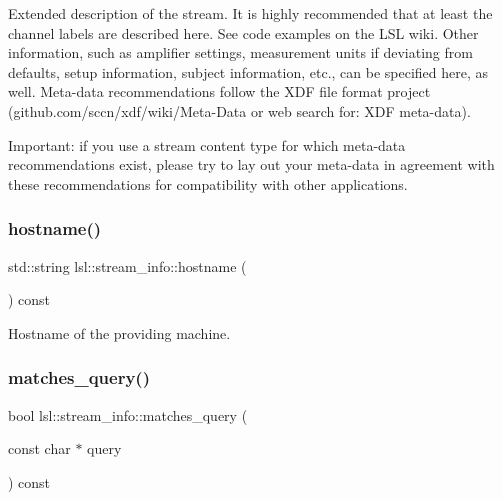 Extended description of the stream. It is highly recommended that at least the channel labels are described here. See code examples on the L\+SL wiki. Other information, such as amplifier settings, measurement units if deviating from defaults, setup information, subject information, etc., can be specified here, as well. Meta-\/data recommendations follow the X\+DF file format project (github.\+com/sccn/xdf/wiki/\+Meta-\/\+Data or web search for\+: X\+DF meta-\/data).

Important\+: if you use a stream content type for which meta-\/data recommendations exist, please try to lay out your meta-\/data in agreement with these recommendations for compatibility with other applications. \mbox{\label{classlsl_1_1stream__info_a52db8d9e073297477d1183dfebe8dcda}} 
\subsubsection{\texorpdfstring{hostname()}{hostname()}}
{\footnotesize\ttfamily std\+::string lsl\+::stream\+\_\+info\+::hostname (\begin{DoxyParamCaption}{ }\end{DoxyParamCaption}) const\hspace{0.3cm}{\ttfamily [inline]}}

Hostname of the providing machine. \mbox{\label{classlsl_1_1stream__info_a6c3474322d467e8d8198c7a6e4c7ad76}} 
\subsubsection{\texorpdfstring{matches\+\_\+query()}{matches\_query()}}
{\footnotesize\ttfamily bool lsl\+::stream\+\_\+info\+::matches\+\_\+query (\begin{DoxyParamCaption}\item[{const char $\ast$}]{query }\end{DoxyParamCaption}) const\hspace{0.3cm}{\ttfamily [inline]}}





